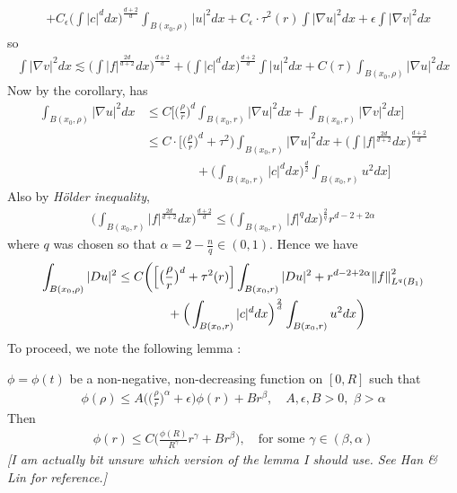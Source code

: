\documentclass[12pt,a4paper]{article}
\newenvironment{proof}
{\begin{changemargin}{0.5cm}{0.5cm} 
	}%
	{\end{changemargin}
}
\newenvironment{subproof}
{\begin{changemargin}{0.5cm}{0.5cm} 
	}%
	{\end{changemargin}
}
\newenvironment{p}
{\begin{proof} 
	}%
	{\end{proof}
}
\begin{document}
\begin{p}
\begin{align*}
& + C_{\epsilon} \Big( \int |c|^d dx \Big)^{\frac{d+2}{d}} \int_{B(x_0, \rho)} |u|^2 dx + C_{\epsilon}\cdot \tau^2(r) \int |\nabla u|^2 dx + \epsilon \int |\nabla v|^2 dx 
\end{align*}
so
\begin{align*}
\int |\nabla v|^2 dx \lesssim \Big( \int |f|^{\frac{2d}{d+2}} dx\Big)^{\frac{d+2}{d}} + \Big( \int |c|^d dx \Big)^{\frac{d+2}{d}} \int |u|^2 dx + C(\tau)\int_{B(x_0, \rho)} |\nabla u|^2 dx 
\end{align*}
Now by the corollary, has 
\begin{align*}
\int_{B(x_0, \rho)} |\nabla u|^2 dx &\leq C \Big[ \Big( \frac{\rho}{r} \Big)^d \int_{B(x_0, r)} |\nabla u|^2 dx + \int_{B(x_0, r)} |\nabla v|^2 dx \Big] \\
& \leq C \cdot \Big[ \Big( \frac{\rho}{r} \Big)^d + \tau^2 \Big) \int_{B(x_0, r)} |\nabla u|^2 dx + \Big( \int |f|^{\frac{2d}{d+2}} dx\Big)^{\frac{d+2}{d}} \\
& \quad \quad\quad\quad + \Big( \int_{B(x_0, r)} |c|^d dx \Big)^{\frac{d}{2}} \int_{B(x_0, r)} u^2 dx \Big]
\end{align*}
Also by \emph{H\"older inequality},
\begin{align*}
\Big( \int_{B(x_0, r)} |f|^{\frac{2d}{d+2}} dx\Big)^{\frac{d+2}{d}} \leq \Big( \int_{B(x_0, r)} |f|^{q}dx \Big)^{\frac{2}{q}} r^{d-2 + 2\alpha}
\end{align*}
where $q$ was chosen so that $\alpha = 2- \frac{n}{q} \in (0,1)$. Hence we have
\begin{align*}
\int_{B(x_0, \rho)} |Du|^2 & \leq C \bigg( \Big[ \big(\frac{\rho}{r} \big)^d + \tau^2(r) \Big] \int_{B(x_0,r)} |Du|^2 + r^{d-2+2\alpha} \snorms{f}{L^q(B_1)}^2 \\
& \quad\quad\quad\quad + \Big( \int_{B(x_0, r)} |c|^d dx\Big)^{\frac{2}{d}}\int_{B(x_0, r)} u^2 dx \bigg)
\end{align*}
To proceed, we note the following lemma :
\begin{subproof}
\lem $\phi =\phi(t)$ be a non-negative, non-decreasing function on $[0, R]$ such that
\begin{align*}
\phi(\rho) \leq A \Big( \big( \frac{\rho}{r}\big)^{\alpha} + \epsilon \Big) \phi(r) + Br^{\beta}, \quad A, \epsilon, B>0, \,\, \beta >\alpha
\end{align*}
Then 
\begin{align*}
\phi(r) \leq C \Big( \frac{\phi(R)}{R^{\gamma}}r^{\gamma} + Br^{\beta} \Big), \quad \text{for some } \gamma \in (\beta , \alpha)
\end{align*}
\emph{[I am actually bit unsure which version of the lemma I should use. See Han \& Lin for reference.]}


\end{subproof}
\end{p}
\end{document}
